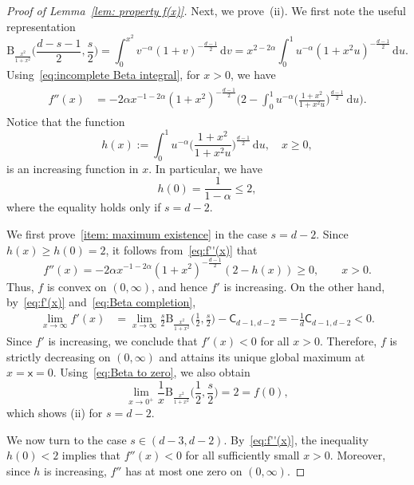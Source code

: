 \documentclass{amsart}
\newcommand{\ud}{\, \mathrm{d}}
\theoremstyle{plain}
\theoremstyle{remark}
\numberwithin{equation}{section}
\begin{document}
\begin{proof}[Proof of Lemma~\ref{lem: property f(x)}]
\medskip
Next, we prove~\textrm{(ii)}. We first note the useful representation 
\begin{equation}\label{eq:incomplete Beta integral}
    \mathrm{B}_{\frac{x^2}{1+x^2}}\Big(\frac{d-s-1}{2},\frac{s}{2}\Big) = \int_0^{x^2} v^{-\alpha}(1+v)^{-\frac{d-1}{2}}\ud v= x^{2-2\alpha}\int_0^1 u^{-\alpha}(1+x^2u)^{-\frac{d-1}{2}}\ud u.
\end{equation}
Using~\eqref{eq:incomplete Beta integral}, for $x>0$, we have 
\begin{align}\label{eq:f''(x)}
\begin{split}
    f''(x) 
    &= -2\alpha x^{-1-2\alpha}(1+x^2)^{-\frac{d-1}{2}}\bigg(2- \int_0^1  u^{-\alpha}\Big(\frac{1+x^2}{1+x^2u}\Big)^{\frac{d-1}{2}}\ud u\bigg).
\end{split}
\end{align}
Notice that the function
\[
h(x):= \int_0^1  u^{-\alpha}\Big(\frac{1+x^2}{1+x^2u}\Big)^{\frac{d-1}{2}}\ud u, \quad x\ge 0,
\]
is an increasing function in $x$. In particular, we have
\begin{equation}
    h(0) = \frac{1}{1-\alpha}\le 2,
\end{equation}
where the equality holds only if $s=d-2$. 

We first prove~\ref{item: maximum existence} in the case $s=d-2$. Since
$h(x)\ge h(0)=2$, it follows from~\eqref{eq:f''(x)} that 
\[
    f''(x) = -2\alpha x^{-1-2\alpha}(1+x^2)^{-\frac{d-1}{2}} (2-h(x) )\ge  0, \qquad x>0. 
\]
Thus, $f$ is convex on $(0,\infty)$, and hence $f'$ is increasing. On the
other hand, by~\eqref{eq:f'(x)} and~\eqref{eq:Beta completion}, 
\begin{align*}
    \lim_{x\to\infty} f'(x) &= \lim_{x\to\infty}\frac{s}{2}\mathrm{B}_{\frac{x^2}{1+x^2}}\Big(\frac{1}{2},\frac{s}{2}\Big) -\mathsf{C}_{d-1,d-2}=-\frac{1}{d}\mathsf{C}_{d-1,d-2}<0.
\end{align*}
Since $f'$ is increasing, we conclude that $f'(x)<0$ for all $x>0$.
Therefore, $f$ is strictly decreasing on $(0,\infty)$ and attains its
unique global maximum at $x=\mathsf{x}=0$. Using~\eqref{eq:Beta to zero}, we also obtain 
\[
    \lim_{x\to0^+}\frac{1}{x}\mathrm{B}_{\frac{x^2}{1+x^2}}\Big(\frac{1}{2},\frac{s}{2}\Big) = 2 = f(0),
\]
which shows (ii) for $s=d-2$. 
 

We now turn to the case $s\in(d-3,d-2)$. By~\eqref{eq:f''(x)},
the inequality $h(0)<2$ implies that $f''(x)<0$ for all sufficiently
small $x>0$. Moreover, since $h$ is increasing, $f''$ has at most one
zero on $(0,\infty)$.


\end{proof}
\end{document}

